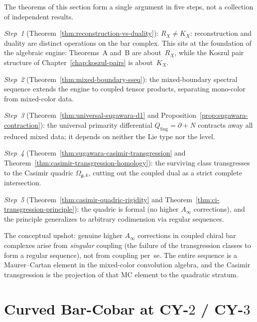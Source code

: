 \begin{remark}
\label{rem:casimir-transgression-position}
The theorems of this section form a single argument in five steps,
not a collection of independent results.

\emph{Step~1} (Theorem~\ref{thm:reconstruction-vs-duality}):
$R_X \neq K_X$: reconstruction and duality are distinct
operations on the bar complex. This sits at the foundation of
the algebraic engine: Theorems~A and~B are about~$R_X$, while
the Koszul pair structure of
Chapter~\ref{chap:koszul-pairs} is about~$K_X$.

\emph{Step~2}
(Theorem~\ref{thm:mixed-boundary-sseq}):
the mixed-boundary spectral sequence extends the engine to coupled
tensor products, separating mono-color from mixed-color data.

\emph{Step~3}
(Theorem~\ref{thm:universal-sugawara-d1} and
Proposition~\ref{prop:sugawara-contraction}):
the universal primarity differential $Q_{\mathrm{Sug}} = \partial + N$
contracts away all reduced mixed data; it depends on neither the Lie
type nor the level.

\emph{Step~4}
(Theorem~\ref{thm:sugawara-casimir-transgression} and
Theorem~\ref{thm:casimir-transgression-homology}):
the surviving class transgresses to the Casimir quadric
$\Omega_{\mathfrak{g},k}$, cutting out the coupled dual as a strict
complete intersection.

\emph{Step~5}
(Theorem~\ref{thm:casimir-quadric-rigidity} and
Theorem~\ref{thm:ci-transgression-principle}):
the quadric is formal (no higher $A_\infty$ corrections), and the
principle generalizes to arbitrary codimension via regular sequences.

The conceptual upshot: genuine higher $A_\infty$ corrections in
coupled chiral bar complexes arise from \emph{singular}
coupling (the failure of the transgression classes to form a
regular sequence), not from coupling per~se. The entire sequence
is a Maurer--Cartan element in the mixed-color
convolution algebra, and the Casimir
transgression is the projection of that MC element to the
quadratic stratum.
\end{remark}

\section{Curved Bar-Cobar at CY-$2$ / CY-$3$}
\label{sec:bccurved-supplement}

